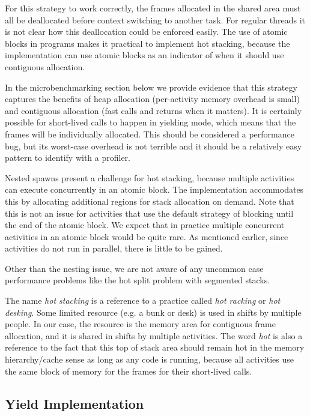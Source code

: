 \documentclass[acmsmall,anonymous,review]{acmart}\settopmatter{printfolios=true,printccs=false,printacmref=false}
\begin{document}
For this strategy to work correctly, the frames allocated in the shared area must all be deallocated before context switching to another task.
For regular threads it is not clear how this deallocation could be enforced easily.
The use of atomic blocks in programs makes it practical to implement hot stacking, because the implementation can use atomic blocks as an indicator of when it should use contiguous allocation.

In the microbenchmarking section below we provide evidence that this strategy captures the benefits of heap allocation (per-activity memory overhead is small) and contiguous allocation (fast calls and returns when it matters).
It is certainly possible for short-lived calls to happen in yielding mode, which means that the frames will be individually allocated.
This should be considered a performance bug, but its worst-case overhead is not terrible and it should be a relatively easy pattern to identify with a profiler.

Nested spawns present a challenge for hot stacking, because multiple activities can execute concurrently in an atomic block.
The implementation accommodates this by allocating additional regions for stack allocation on demand.
Note that this is not an issue for activities that use the default strategy of blocking until the end of the atomic block.
We expect that in practice multiple concurrent activities in an atomic block would be quite rare.
As mentioned earlier, since activities do not run in parallel, there is little to be gained.

Other than the nesting issue, we are not aware of any uncommon case performance problems like the hot split problem with segmented stacks.

The name \emph{hot stacking} is a reference to a practice called \emph{hot racking} or \emph{hot desking}.
Some limited resource (e.g. a bunk or desk) is used in shifts by multiple people.
In our case, the resource is the memory area for contiguous frame allocation, and it is shared in shifts by multiple activities.
The word \emph{hot} is also a reference to the fact that this top of stack area should remain hot in the memory hierarchy/cache sense as long as any code is running, because all activities use the same block of memory for the frames for their short-lived calls.

\subsection{Yield Implementation}
\label{sec:yield_imp}
\end{document}
